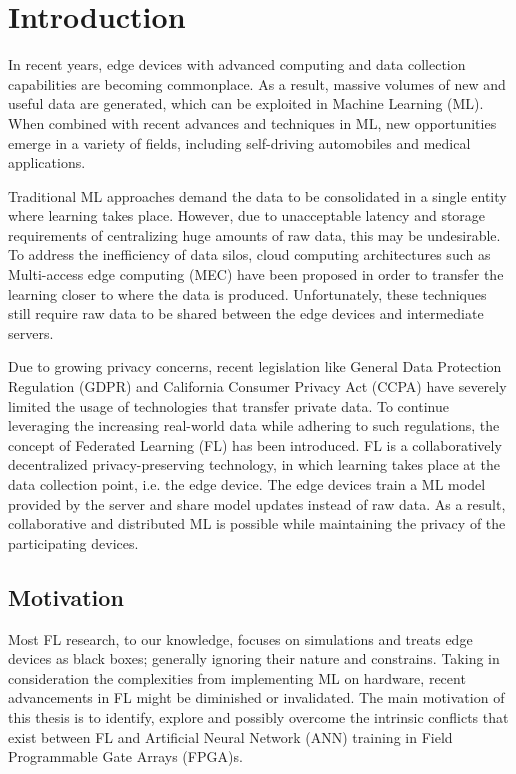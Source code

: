 \chapter{Introduction}
\label{Chapter-Introduction}

In recent years, edge devices with advanced computing and data collection capabilities are becoming commonplace. As a result, massive volumes of new and useful data are generated, which can be exploited in Machine Learning (ML). When combined with recent advances and techniques in ML, new opportunities emerge in a variety of fields, including self-driving automobiles and medical applications. 

Traditional ML approaches demand the data to be consolidated in a single entity where learning takes place. However, due to unacceptable latency and storage requirements of centralizing huge amounts of raw data, this may be undesirable. To address the inefficiency of data silos, cloud computing architectures such as Multi-access edge computing (MEC) \cite{MEC} have been proposed in order to transfer the learning closer to where the data is produced. Unfortunately, these techniques still require raw data to be shared between the edge devices and intermediate servers.

Due to growing privacy concerns, recent legislation like General Data Protection Regulation (GDPR) \cite{GDPR} and California Consumer Privacy Act (CCPA) \cite{CCPA} have severely limited the usage of technologies that transfer private data. To continue leveraging the increasing real-world data while adhering to such regulations, the concept of Federated Learning (FL) \cite{FL-original-paper} has been introduced. FL is a collaboratively decentralized privacy-preserving technology, in which learning takes place at the data collection point, i.e. the edge device. The edge devices train a ML model provided by the server and share model updates instead of raw data. As a result, collaborative and distributed ML is possible while maintaining the privacy of the participating devices.

\section{Motivation}

Most FL research, to our knowledge, focuses on simulations and treats edge devices as black boxes; generally ignoring their nature and constrains. Taking in consideration the complexities from implementing ML on hardware, recent advancements in FL might be diminished or invalidated. The main motivation of this thesis is to identify, explore and possibly overcome the intrinsic conflicts that exist between FL and Artificial Neural Network (ANN) training in Field Programmable Gate Arrays (FPGA)s. %


